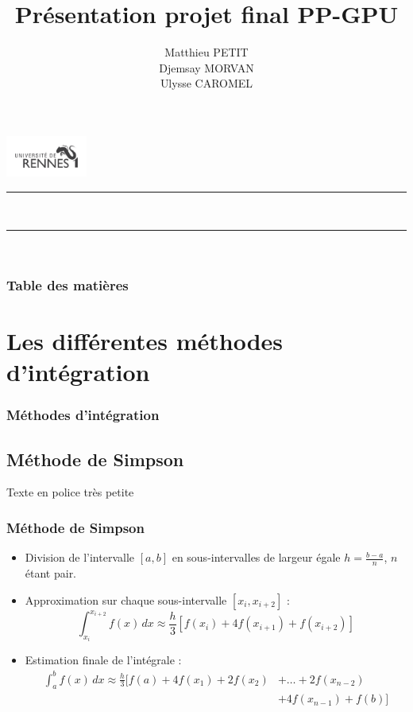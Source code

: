 \documentclass[10pt]{beamer}
\title{Présentation projet final PP-GPU}
\author{Matthieu PETIT \\ Djemsay MORVAN \\ Ulysse CAROMEL}
\begin{document}
\begin{frame}
    \includegraphics[width=0.2\textwidth]{../Images/univ-rennes1.png}
    \rule{\linewidth}{0.3mm} \\[0.4cm]
    \titlepage
    \rule{\linewidth}{0.3mm} \\[0.4cm]
\end{frame}

\begin{frame}
    \frametitle[Table des matières]{Table des matières}
    \tableofcontents
\end{frame}

\section{Les différentes méthodes d'intégration}

\begin{frame}
    \frametitle{Méthodes d'intégration}  
    \tableofcontents[currentsection]  
\end{frame}

\subsection{Méthode de Simpson}


\begin{frame}
    {\fontsize{4}{5}\selectfont Texte en police très petite}

    \frametitle{Méthode de Simpson}

    \begin{itemize}
        \item Division de l'intervalle $[a, b]$ en sous-intervalles de largeur égale $h = \frac{b - a}{n}$, $n$ étant pair.
        
        \item Approximation sur chaque sous-intervalle $[x_i, x_{i+2}]$ :
            \[
            \int_{x_i}^{x_{i+2}} f(x) \,dx \approx \frac{h}{3} \left[ f(x_i) + 4f(x_{i+1}) + f(x_{i+2}) \right]
            \]
        
        \item Estimation finale de l'intégrale :
            \begin{align*}
                \int_{a}^{b} f(x) \,dx \approx \frac{h}{3} \Big [ f(a) + 4f(x_1) + 2f(x_2) &+ \ldots + 2f(x_{n-2})  \\
                &+ 4f(x_{n-1}) + f(b) \Big ]
            \end{align*}
    \end{itemize}
    
\end{frame}
\end{document}

